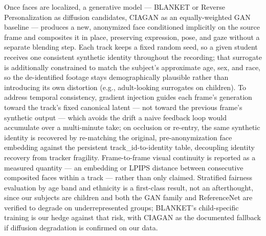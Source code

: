 \documentclass[12pt]{article}
\begin{document}
Once faces are localized, a generative model — BLANKET or Reverse Personalization as diffusion candidates, CIAGAN as an equally-weighted GAN baseline — produces a new, anonymized face conditioned implicitly on the source frame and composites it in place, preserving expression, pose, and gaze without a separate blending step. Each track keeps a fixed random seed, so a given student receives one consistent synthetic identity throughout the recording; that surrogate is additionally constrained to match the subject's approximate age, sex, and race, so the de-identified footage stays demographically plausible rather than introducing its own distortion (e.g., adult-looking surrogates on children). To address temporal consistency, gradient injection \cite{wang} guides each frame's generation toward the track's fixed canonical latent — not toward the previous frame's synthetic output — which avoids the drift a naive feedback loop would accumulate over a multi-minute take; on occlusion or re-entry, the same synthetic identity is recovered by re-matching the original, pre-anonymization face embedding against the persistent track\_id-to-identity table, decoupling identity recovery from tracker fragility. Frame-to-frame visual continuity is reported as a measured quantity — an embedding or LPIPS distance between consecutive composited faces within a track — rather than only claimed. Stratified fairness evaluation by age band and ethnicity is a first-class result, not an afterthought, since our subjects are children and both the GAN family and ReferenceNet are verified to degrade on underrepresented groups; BLANKET's child-specific training is our hedge against that risk, with CIAGAN as the documented fallback if diffusion degradation is confirmed on our data.
\end{document}
